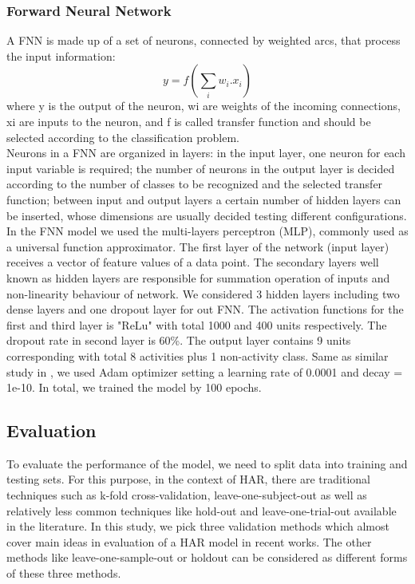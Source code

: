 \documentclass[journal,article,submit,moreauthors,pdftex]{Definitions/mdpi}
\begin{document}
\subsubsection{Forward Neural Network}
A FNN is made up of a set of neurons, connected by weighted arcs, that process the input
information\cite{zhang1999geometrical}:
\begin{equation}\label{fnn_formula}
 y = f(\sum_{i}^{}w_{i}.x_{i})
\end{equation}
where y is the output of the neuron, wi are weights of the incoming connections, xi are inputs to the neuron, and f is called transfer function and should be selected according to the classification problem.\\
Neurons in a FNN are organized in layers: in the input layer, one neuron for each input variable is required; the number of neurons in the output layer is decided according to the number of classes to be recognized and the selected transfer function; between input and output layers a certain number of hidden layers can be inserted, whose dimensions are usually decided testing different configurations. \\
In the FNN model we used the multi-layers perceptron (MLP), commonly used as a universal function approximator. The first layer of the network (input layer) receives a vector of feature values of a data point. The secondary layers well known as hidden layers are responsible for summation operation of inputs and non-linearity behaviour of network. We considered 3 hidden layers including two dense layers and one dropout layer for out FNN. The activation functions for the first and third layer is "ReLu" \cite{nair2010rectified} with total 1000 and 400 units respectively. The dropout rate in second layer is 60\%. The output layer contains 9 units corresponding with total 8 activities plus 1 non-activity class. Same as similar study in \cite{baldominos2019comparison}, we used Adam optimizer setting a learning rate of 0.0001 and decay = 1e-10. In total, we trained the model by 100 epochs.


\subsection{Evaluation}
To evaluate the performance of the model, we need to split data into training and testing sets. For this purpose, in the context of HAR, there are traditional techniques such as k-fold cross-validation, leave-one-subject-out \cite{jordao2018human} as well as relatively less common techniques like hold-out and leave-one-trial-out \cite{sena2018multiscale} available in the literature. In this study, we pick three validation methods which almost cover main ideas in evaluation of a HAR model in recent works. The other methods like leave-one-sample-out or holdout can be considered as different forms of these three methods.
\end{document}
